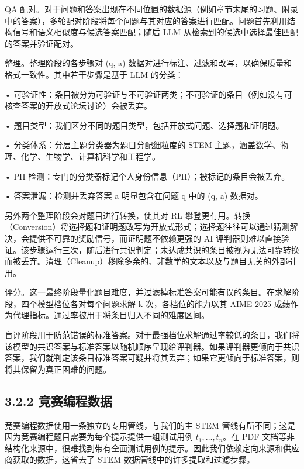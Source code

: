 QA 配对。对于问题和答案出现在不同位置的数据源（例如章节末尾的习题、附录中的答案），多轮配对阶段将每个问题与其对应的答案进行匹配。问题首先利用结构信号和语义相似度与候选答案匹配；随后 LLM 从检索到的候选中选择最佳匹配的答案并验证配对。

整理。整理阶段的各步骤对 (q, a) 数据对进行标注、过滤和改写，以确保质量和格式一致性。其中若干步骤是基于 LLM 的分类：

• 可验证性：条目被分为可验证与不可验证两类；不可验证的条目（例如没有可核查答案的开放式论坛讨论）会被丢弃。

• 题目类型：我们区分不同的题目类型，包括开放式问题、选择题和证明题。

• 分类体系：分层主题分类器为题目分配细粒度的 STEM 主题，涵盖数学、物理、化学、生物学、计算机科学和工程学。

• PII 检测：专门的分类器标记个人身份信息（PII）；被标记的条目会被丢弃。



• 答案泄漏：检测并丢弃答案 a 明显包含在问题 q 中的 (q, a) 数据对。

另外两个整理阶段会对题目进行转换，使其对 RL 攀登更有用。转换（Conversion）将选择题和证明题改写为开放式形式；选择题往往可以通过猜测解决，会提供不可靠的奖励信号，而证明题不依赖更强的 AI 评判器则难以直接验证。该步骤运行三次，随后进行共识判定；未达成共识的条目被视为无法可靠转换而被丢弃。清理（Cleanup）移除多余的、非数学的文本以及与题目无关的外部引用。

评分。这一最终阶段量化题目难度，并过滤掉标准答案可能有误的条目。在求解阶段，四个模型档位各对每个问题求解 k 次，各档位的能力以其 AIME 2025 成绩作为代理指标。通过率被用于将条目归入不同的难度区间。

盲评阶段用于防范错误的标准答案。对于最强档位求解通过率较低的条目，我们将该模型的共识答案与标准答案以随机顺序呈现给评判器。如果评判器更倾向于共识答案，我们就判定该条目标准答案可疑并将其丢弃；如果它更倾向于标准答案，则将其保留为真正困难的问题。

\subsection{3.2.2 竞赛编程数据}\label{competitive-coding-data}

竞赛编程数据使用一条独立的专用管线，与我们的主 STEM 管线有所不同；这是因为竞赛编程题目需要为每个提示提供一组测试用例 \(t _ { 1 } , \ldots , t _ { n }\)。在 PDF 文档等非结构化来源中，很难找到带有全面测试用例的提示。因此我们依赖定向来源和供应商获取的数据，这省去了 STEM 数据管线中的许多提取和过滤步骤。

